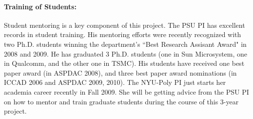 \paragraph{\textbf{Training of Students}:} Student mentoring is a key
component of this project. The PSU PI has excellent records in
student training.  His mentoring efforts were recently
  recognized with two Ph.D. students winning the department's ``Best Research Assisant Award" in 2008 and 2009. He has graduated 3 Ph.D. students (one in Sun
Microsystem, one in Qualcomm, and the other one in TSMC).
His students have received one best paper award (in ASPDAC
2008), and three best paper award nominations (in ICCAD 2006 and
ASPDAC 2009, 2010). The NYU-Poly PI just starts her academia career
recently in Fall 2009. She will be getting advice from the PSU PI on how to mentor and train graduate students during the course of this 3-year project.

